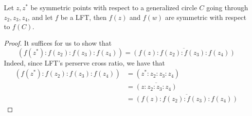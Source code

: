 \begin{theorem}
    Let $z, z^*$ be symmetric points with respect to a generalized circle $C$ going through $z_2, z_3, z_4$, and let $f$ be a LFT, then $f(z)$ and $f(w)$ are symmetric with respect to $f(C)$.
\end{theorem}

\begin{proof}
    It suffices for us to show that
    \[(f(z^*) : f(z_2) : f(z_3) : f(z_4)) = \overline{(f(z) : f(z_2) : f(z_3) : f(z_4))}\]
    Indeed, since LFT's perserve cross ratio, we have that
    \begin{align*}
        (f(z^*) : f(z_2) : f(z_3) : f(z_4)) &= (z^* : z_2 : z_3 : z_4)\\
        &= \overline{(z : z_2 : z_3 : z_4)} \tag*{Since $z$ and $z^*$ are symmetric}\\
        &= \overline{(f(z) : f(z_2) : f(z_3) : f(z_4))}
    \end{align*}
\end{proof}